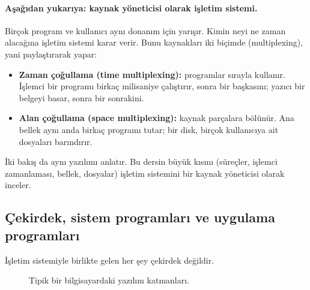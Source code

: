 \paragraph{Aşağıdan yukarıya: kaynak yöneticisi olarak işletim sistemi.} Birçok program ve kullanıcı aynı donanım için yarışır. Kimin neyi ne zaman alacağına işletim sistemi karar verir. Bunu kaynakları iki biçimde  (multiplexing), yani paylaştırarak yapar:
\begin{itemize}
  \item \textbf{Zaman çoğullama (time multiplexing):} programlar sırayla kullanır. İşlemci bir programı birkaç milisaniye çalıştırır, sonra bir başkasını; yazıcı bir belgeyi basar, sonra bir sonrakini.
  \item \textbf{Alan çoğullama (space multiplexing):} kaynak parçalara bölünür. Ana bellek aynı anda birkaç programı tutar; bir disk, birçok kullanıcıya ait dosyaları barındırır.
\end{itemize}

İki bakış da aynı yazılımı anlatır. Bu dersin büyük kısmı (süreçler, işlemci zamanlaması, bellek, dosyalar) işletim sistemini bir kaynak yöneticisi olarak inceler.

\subsection{Çekirdek, sistem programları ve uygulama programları}

İşletim sistemiyle birlikte gelen her şey çekirdek değildir.

\begin{figure}[H]
\centering
{}
\caption{Tipik bir bilgisayardaki yazılım katmanları.}
\end{figure}

